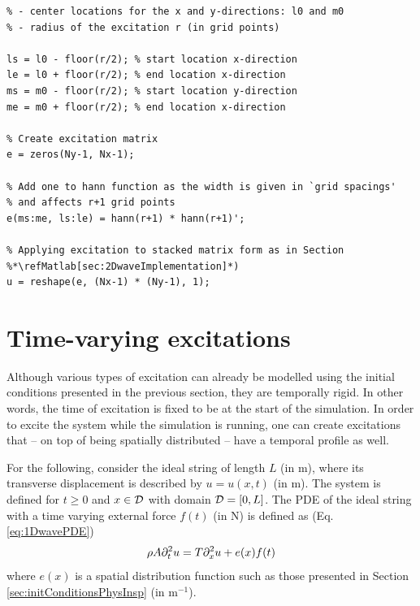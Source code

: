 \noindent
\begin{minipage}{\textwidth}
\setlstMAT
\begin{lstlisting}[caption={A \texttt{MATLAB} implementation of a 2D raised cosine.}, label=alg:2DraisedCos]
% Assuming Dirichlet boundary conditions and having initialised the following
% - center locations for the x and y-directions: l0 and m0
% - radius of the excitation r (in grid points)

ls = l0 - floor(r/2); % start location x-direction
le = l0 + floor(r/2); % end location x-direction
ms = m0 - floor(r/2); % start location y-direction
me = m0 + floor(r/2); % end location x-direction

% Create excitation matrix
e = zeros(Ny-1, Nx-1);

% Add one to hann function as the width is given in `grid spacings'
% and affects r+1 grid points
e(ms:me, ls:le) = hann(r+1) * hann(r+1)';

% Applying excitation to stacked matrix form as in Section %*\refMatlab[sec:2DwaveImplementation]*)
u = reshape(e, (Nx-1) * (Ny-1), 1);
\end{lstlisting} 
\end{minipage}
    
\section{Time-varying excitations}
Although various types of excitation can already be modelled using the initial conditions presented in the previous section, they are temporally rigid. In other words, the time of excitation is fixed to be at the start of the simulation. In order to excite the system while the simulation is running, one can create excitations that -- on top of being spatially distributed -- have a temporal profile as well.

For the following, consider the ideal string of length $L$ (in m), where its transverse displacement is described by $u = u(x,t)$ (in m). The system is defined for $t\geq 0$ and $x\in\mathcal{D}$ with domain $\mathcal{D} = [0, L]$. The PDE of the ideal string with a time varying external force $f(t)$ (in N) is defined as (Eq. \eqref{eq:1DwavePDE})
\begin{equation}\label{eq:timeVaryingExcitation1DWave}
    \rho A\partial_t^2 u = T \partial_x^2 u + e(x)f(t)
\end{equation}
where $e(x)$ is a spatial distribution function such as those presented in Section \ref{sec:initConditionsPhysInsp} (in m$^{-1}$).

